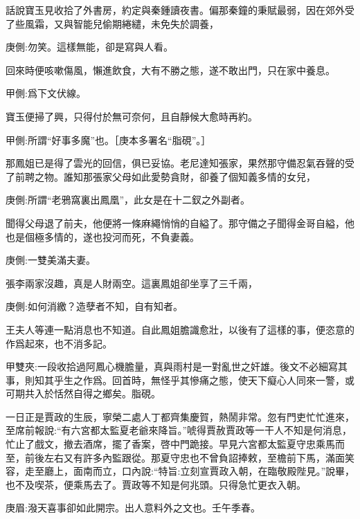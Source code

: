 \begin{parag}
    話說寶玉見收拾了外書房，約定與秦鍾讀夜書。偏那秦鐘的秉賦最弱，因在郊外受了些風霜，又與智能兒偷期綣繾，未免失於調養，\begin{note}庚側:勿笑。這樣無能，卻是寫與人看。\end{note}回來時便咳嗽傷風，懶進飲食，大有不勝之態，遂不敢出門，只在家中養息。\begin{note}甲側:爲下文伏線。\end{note}寶玉便掃了興，只得付於無可奈何，且自靜候大愈時再約。\begin{note}甲側:所謂“好事多魔”也。［庚本多署名“脂硯”。］\end{note}
\end{parag}


\begin{parag}
    那鳳姐已是得了雲光的回信，俱已妥協。老尼達知張家，果然那守備忍氣吞聲的受了前聘之物。誰知那張家父母如此愛勢貪財，卻養了個知義多情的女兒，\begin{note}庚側:所謂“老鴉窩裏出鳳凰”，此女是在十二釵之外副者。\end{note}聞得父母退了前夫，他便將一條麻繩悄悄的自縊了。那守備之子聞得金哥自縊，他也是個極多情的，遂也投河而死，不負妻義。\begin{note}庚側:一雙美滿夫妻。\end{note}張李兩家沒趣，真是人財兩空。這裏鳳姐卻坐享了三千兩，\begin{note}庚側:如何消繳？造孽者不知，自有知者。\end{note}王夫人等連一點消息也不知道。自此鳳姐膽識愈壯，以後有了這樣的事，便恣意的作爲起來，也不消多記。\begin{note}甲雙夾:一段收拾過阿鳳心機膽量，真與雨村是一對亂世之奸雄。後文不必細寫其事，則知其乎生之作爲。回首時，無怪乎其慘痛之態，使天下癡心人同來一警，或可期共入於恬然自得之鄉矣。脂硯。\end{note}
\end{parag}


\begin{parag}
    一日正是賈政的生辰，寧榮二處人丁都齊集慶賀，熱鬧非常。忽有門吏忙忙進來，至席前報說:“有六宮都太監夏老爺來降旨。”唬得賈赦賈政等一干人不知是何消息，忙止了戲文，撤去酒席，擺了香案，啓中門跪接。早見六宮都太監夏守忠乘馬而至，前後左右又有許多內監跟從。那夏守忠也不曾負詔捧敕，至檐前下馬，滿面笑容，走至廳上，面南而立，口內說:“特旨:立刻宣賈政入朝，在臨敬殿陛見。”說畢，也不及喫茶，便乘馬去了。賈政等不知是何兆頭。只得急忙更衣入朝。\begin{note}庚眉:潑天喜事卻如此開宗。出人意料外之文也。壬午季春。\end{note}
\end{parag}


